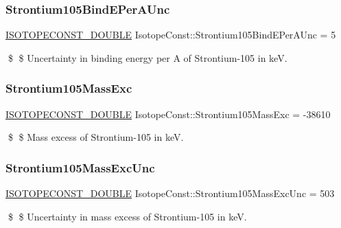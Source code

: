 \subsubsection{\texorpdfstring{Strontium105\+Bind\+E\+Per\+A\+Unc}{Strontium105BindEPerAUnc}}
{\footnotesize\ttfamily \mbox{\hyperlink{group___isotope_const-_macros_ga8f45a7272ce02c0b4c65c44636ed719a}{I\+S\+O\+T\+O\+P\+E\+C\+O\+N\+S\+T\+\_\+\+D\+O\+U\+B\+LE}} Isotope\+Const\+::\+Strontium105\+Bind\+E\+Per\+A\+Unc = 5}

\$ \$ Uncertainty in binding energy per A of Strontium-\/105 in keV. \mbox{\label{group___isotope_const-_strontium-_sr105_ga0378456092803288a2548a96c88f935f}} 
\subsubsection{\texorpdfstring{Strontium105\+Mass\+Exc}{Strontium105MassExc}}
{\footnotesize\ttfamily \mbox{\hyperlink{group___isotope_const-_macros_ga8f45a7272ce02c0b4c65c44636ed719a}{I\+S\+O\+T\+O\+P\+E\+C\+O\+N\+S\+T\+\_\+\+D\+O\+U\+B\+LE}} Isotope\+Const\+::\+Strontium105\+Mass\+Exc = -\/38610}

\$ \$ Mass excess of Strontium-\/105 in keV. \mbox{\label{group___isotope_const-_strontium-_sr105_ga561f8d0811cc61ac38e4bdcb55656ece}} 
\subsubsection{\texorpdfstring{Strontium105\+Mass\+Exc\+Unc}{Strontium105MassExcUnc}}
{\footnotesize\ttfamily \mbox{\hyperlink{group___isotope_const-_macros_ga8f45a7272ce02c0b4c65c44636ed719a}{I\+S\+O\+T\+O\+P\+E\+C\+O\+N\+S\+T\+\_\+\+D\+O\+U\+B\+LE}} Isotope\+Const\+::\+Strontium105\+Mass\+Exc\+Unc = 503}

\$ \$ Uncertainty in mass excess of Strontium-\/105 in keV. \mbox{\label{group___isotope_const-_strontium-_sr105_ga0d678a6061d925457e4972a0fb57eb3d}} 
